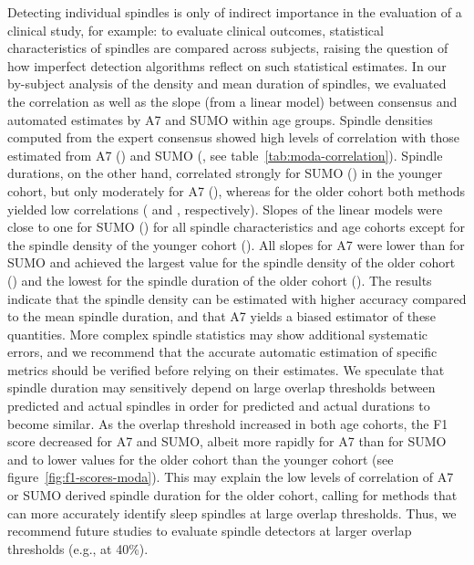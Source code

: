 \documentclass[fleqn,twocolumn,10pt]{wlscirep}
\begin{document}
Detecting individual spindles is only of indirect importance in the evaluation
of a clinical study, for example: to evaluate clinical outcomes, statistical
characteristics of spindles are compared across subjects, raising the question
of how imperfect detection algorithms reflect on such statistical estimates.
In our by-subject analysis of the density and mean duration of spindles, we
evaluated the correlation as well as the slope (from a linear model) between
consensus and automated estimates by A7 and SUMO within age groups.
Spindle densities computed from the expert consensus showed high levels of
correlation with those estimated from A7 () and SUMO (, see table~\ref{tab:moda-correlation}).  Spindle durations, on the other
hand, correlated strongly for SUMO () in the younger cohort, but
only moderately for A7 (), whereas for the older cohort both methods
yielded low correlations ( and , respectively).
Slopes of the linear models were close to one for SUMO () for all
spindle characteristics and age cohorts except for the spindle density of the
younger cohort (). All slopes for A7 were lower than for SUMO and
achieved the largest value for the spindle density of the older cohort
() and the lowest for the spindle duration of the older cohort
().
The results indicate that the spindle density can be estimated with higher
accuracy compared to the mean spindle duration, and that A7 yields a biased
estimator of these quantities.  More complex spindle statistics may show
additional systematic errors, and we recommend that the accurate automatic
estimation of specific metrics should be verified before relying on their
estimates.
We speculate that spindle duration may sensitively depend on large overlap
thresholds between predicted and actual spindles in order for predicted and
actual durations to become similar. As the overlap threshold increased in both
age cohorts, the F1 score decreased for A7 and SUMO, albeit more rapidly for A7
than for SUMO and to lower values for the older cohort than the younger cohort
(see figure~\ref{fig:f1-scores-moda}). This may explain the low levels of
correlation of A7 or SUMO derived spindle duration for the older cohort,
calling for methods that can more accurately identify sleep spindles at large
overlap thresholds.
Thus, we recommend future studies to evaluate spindle detectors at larger overlap
thresholds (e.g., at 40\%).
\end{document}
